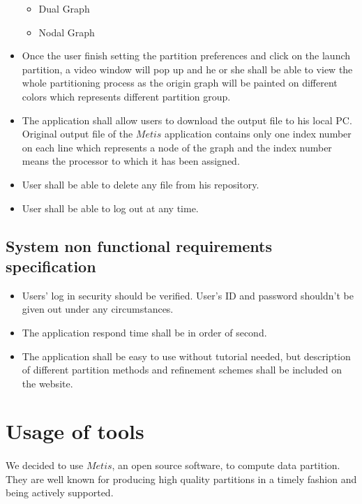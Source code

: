 \documentclass{cranfieldChart}
\begin{document}
\begin{itemize}
\begin{itemize}
        \item Dual Graph
        \item Nodal Graph 
    \end{itemize}
    \item Once the user finish setting the partition preferences and click on the launch partition, a video window will pop up and he or she shall be able to view the whole partitioning process as the origin graph will be painted on different colors which represents different partition group. 
    \item The application shall allow users to download the output file to his local PC. Original output file of the $Metis$ application contains only one index number on each line which represents a node of the graph and the index number means the processor to which it has been assigned. 
    \item User shall be able to delete any file from his repository. 
    \item User shall be able to log out at any time. 
\end{itemize}
    
\subsection{System non functional requirements specification}
    \begin{itemize}
        \item Users' log in security should be verified. User's ID and password shouldn't be given out under any circumstances. 
        \item The application respond time shall be in order of second. 
        \item The application shall be easy to use without tutorial needed, but description of different partition methods and refinement schemes shall be included on the website.
     \end{itemize}
     
\section{Usage of tools}
\paragraph{}
We decided to use $Metis$, an open source software, to compute data partition. They are well known for producing high quality partitions in a timely fashion and being actively supported. 
\end{document}

